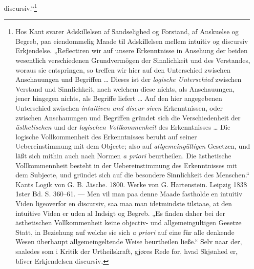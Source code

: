 \documentclass[11pt]{book}
\begin{document}
discursiv.“\footnote{%
Hos Kant svarer Adskillelsen af Sandselighed og Forstand, af Anskuelse
og Begreb, paa eiendommelig Maade til Adskillelsen mellem intuitiv og
discursiv Erkjendelse. „Reflectiren wir auf unsere Erkenntnisse in
Ansehung der beiden wesentlich verschiedenen
Grundvermögen der Sinnlichkeit und des Verstandes, woraus sie
entspringen, so treffen wir hier auf den Unterschied zwischen
Anschauungen und Begriffen \ldots{} Dieses ist der \emph{logische
Unterschied} zwischen Verstand und Sinnlichkeit, nach welchem diese
nichts, als Anschauungen, jener hingegen nichts, als Begriffe liefert
\ldots{} Auf den hier angegebenen Unterschied zwischen
\emph{intuitiven und discur\-%
siven} Erkenntnissen, oder zwischen Anschauungen und Begriffen gründet
sich die Verschiedenheit der \emph{ästhetischen} und der
\emph{logischen Vollkommenheit} des Erkenntnisses \ldots{} Die logische
Vollkommenheit des Erkenntnisses beruht auf seiner Uebereinstimmung mit
dem Objecte; also auf \emph{allgemeingültigen} Gesetzen, und läßt sich
mithin auch nach Normen \textit{a priori} beurtheilen. Die ästhetische
Vollkommennheit besteht in der Uebereinstimmung des Erkenntnisses mit
dem Subjecte, und gründet sich auf die besondere Sinnlichkeit des
Menschen.“ Kants Logik von G. B. Jäsche. 1800. Werke von
G. Hartenstein. Leipzig 1838 1ster Bd. S. 360--61. --- Men vil man paa
denne Maade fastholde en intuitiv Viden ligeoverfor en discursiv, saa
maa man idetmindste tilstaae, at den intuitive Viden er uden al Indsigt
og Begreb. „Es finden daher bei der ästhetischen Vollkommenheit keine
objectiv- und allgemeingültigen Gesetze Statt, in Beziehung auf welche
sie sich \textit{a priori} auf eine für alle denkende Wesen überhaupt
allgemeingeltende Weise beurtheilen ließe.“ Selv naar der, saaledes som
i Kritik der Urtheilskraft, gjøres Rede for, hvad Skjønhed er, bliver
Erkjendelsen discursiv.}
\end{document}
